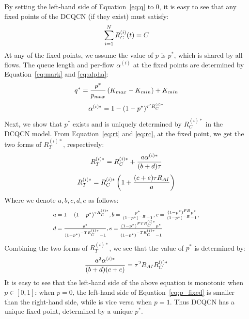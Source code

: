  By setting the left-hand side of Equation~\ref{eq:q} to 0,
it is easy to see that any fixed points of the DCQCN (if they exist) must
satisfy:
\begin{equation}
\small
\sum\limits_{i = 1}^N {R_C^{(i)}(t)} = C
\label{eq:fixedrc}
\end{equation}
At any of the fixed points, we assume the value of $p$ is $p^*$, which is shared
by all flows. The queue length and per-flow $\alpha^{(i)}$ at the fixed points
are determined by Equation~\ref{eq:mark} and \ref{eq:alpha}:
\begin{equation}
\small
{q^*} = \frac{{{p^*}}}{{{p_{max}}}}\left( {{K_{max}} - {K_{min}}} \right) + {K_{min}}
\end{equation}
\begin{equation}
\small
\alpha^{(i)*}  = 1 - {(1 - p^*)^{{\tau '}R_C^{(i)*}}}
\end{equation}
Next, we show that $p^*$ exists and is uniquely determined by $R_C^{(i)*}$ in
the DCQCN model.  From Equation~\ref{eq:rt} and \ref{eq:rc}, at the fixed point,
we get the two forms of $R_T^{(i)*}$, respectively:
\begin{equation}
\small
{R_T^{(i)*}} = R_C^{(i)*} + \frac{{a\alpha^{(i)*} }}{{(b + d)\tau }}
\end{equation}
\begin{equation}
\small
{R_T^{(i)*}} = R_C^{(i)*}\left( {1 + \frac{{(c + e)\tau {R_{AI}}}}{a}} \right)
\end{equation}
Where we denote $a, b, c, d, e$ as follows:
\begin{equation}
\small
\begin{array}{l}
a = 1 - {(1 - p^*)^{\tau {R_C^{(i)*}}}},b = \frac{{p^*}}{{{{(1 - p^*)}^{ - B}} - 1}},c = \frac{{{{(1 - p^*)}^{FB}}p^*}}{{{{(1 - p^*)}^{ - B}} - 1}},\\
d = \frac{{p^*}}{{{{(1 - p^*)}^{ - T{R_C^{(i)*}}}} - 1}},e = \frac{{{{(1 - p^*)}^{FT{R_C^{(i)*}}}}p^*}}{{{{(1 - p^*)}^{ - T{R_C^{(i)*}}}} - 1}}
\end{array}
\end{equation}
Combining the two forms of $R_T^{(i)*}$, we see that the value of $p^*$ is determined by:
\begin{equation}
\small
\frac{{{a^2}\alpha^{(i)*} }}{{(b + d)(c + e)}} = {\tau ^2}{R_{AI}}R_C^{(i)*}
\label{eq:p_fixed}
\end{equation}
It is easy to see that the left-hand side of the above equation is monotonic when
$p \in [0,1]$: when $p = 0$, the left-hand side of Equation~\ref{eq:p_fixed} is
smaller than the right-hand side, while is vice versa when $p = 1$. Thus DCQCN
has a unique fixed point, determined by a unique $p^*$. 

